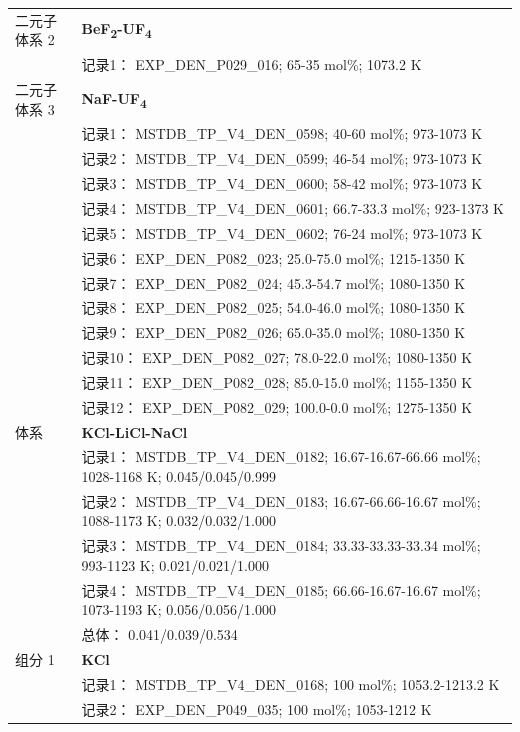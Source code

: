 \documentclass[12pt]{article}
\begin{document}
{\begin{longtable}[]{@{}
  >{\raggedright\arraybackslash}p{}
  >{\raggedright\arraybackslash}p{}@{}}
二元子体系 2  & \textbf{BeF\textsubscript{2}-UF\textsubscript{4}} \\
 & 记录1： EXP\_DEN\_P029\_016; 65-35 mol\%; 1073.2 K  \\

二元子体系 3  & \textbf{NaF-UF\textsubscript{4}} \\
 & 记录1： MSTDB\_TP\_V4\_DEN\_0598; 40-60 mol\%; 973-1073 K \\
 & 记录2： MSTDB\_TP\_V4\_DEN\_0599; 46-54 mol\%; 973-1073 K \\
 & 记录3： MSTDB\_TP\_V4\_DEN\_0600; 58-42 mol\%; 973-1073 K \\
 & 记录4： MSTDB\_TP\_V4\_DEN\_0601; 66.7-33.3 mol\%; 923-1373 K \\
 & 记录5： MSTDB\_TP\_V4\_DEN\_0602; 76-24 mol\%; 973-1073 K \\
 & 记录6： EXP\_DEN\_P082\_023; 25.0-75.0 mol\%; 1215-1350 K \\
 & 记录7： EXP\_DEN\_P082\_024; 45.3-54.7 mol\%; 1080-1350 K \\
 & 记录8： EXP\_DEN\_P082\_025; 54.0-46.0 mol\%; 1080-1350 K \\
 & 记录9： EXP\_DEN\_P082\_026; 65.0-35.0 mol\%; 1080-1350 K \\
 & 记录10： EXP\_DEN\_P082\_027; 78.0-22.0 mol\%; 1080-1350 K \\
 & 记录11： EXP\_DEN\_P082\_028; 85.0-15.0 mol\%; 1155-1350 K \\
 & 记录12： EXP\_DEN\_P082\_029; 100.0-0.0 mol\%; 1275-1350 K  \\

\midrule
体系 & \textbf{KCl-LiCl-NaCl} \\
 & 记录1： MSTDB\_TP\_V4\_DEN\_0182; 16.67-16.67-66.66 mol\%; 1028-1168 K; 0.045/0.045/0.999 \\
 & 记录2： MSTDB\_TP\_V4\_DEN\_0183; 16.67-66.66-16.67 mol\%; 1088-1173 K; 0.032/0.032/1.000 \\
 & 记录3： MSTDB\_TP\_V4\_DEN\_0184; 33.33-33.33-33.34 mol\%; 993-1123 K; 0.021/0.021/1.000 \\
 & 记录4： MSTDB\_TP\_V4\_DEN\_0185; 66.66-16.67-16.67 mol\%; 1073-1193 K; 0.056/0.056/1.000 \\
 & 总体： 0.041/0.039/0.534  \\

组分 1  & \textbf{KCl} \\
 & 记录1： MSTDB\_TP\_V4\_DEN\_0168; 100 mol\%; 1053.2-1213.2 K \\
 & 记录2： EXP\_DEN\_P049\_035; 100 mol\%; 1053-1212 K  \\


\end{longtable}}
\end{document}
